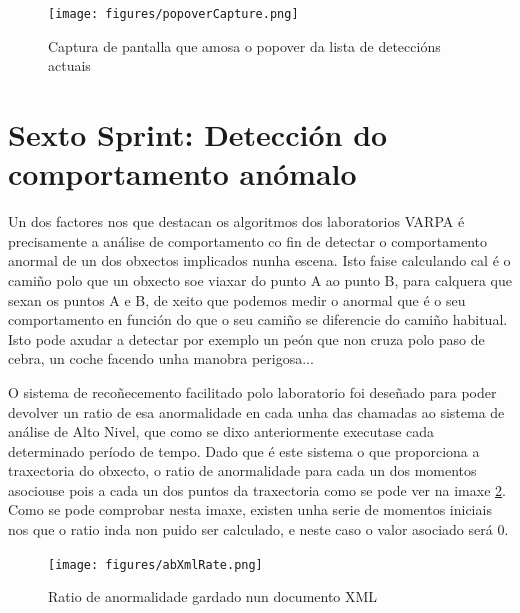         \begin{figure}[htp]
        \begin{center}
            \texttt{[image: figures/popoverCapture.png]}
            \caption{Captura de pantalla que amosa o popover da lista de deteccións actuais}
        \label{fig:popoverCapture}
        \end{center}
        \end{figure}
        
    
\section{Sexto Sprint: Detección do comportamento anómalo}
    
    Un dos factores nos que destacan os algoritmos dos laboratorios VARPA é precisamente a análise
    de comportamento co fin de detectar o comportamento anormal de un dos obxectos implicados nunha
    escena. Isto faise calculando cal é o camiño polo que un obxecto soe viaxar do punto A ao 
    punto B, para calquera que sexan os puntos A e B, de xeito que podemos medir o anormal que é
    o seu comportamento en función do que o seu camiño se diferencie do camiño habitual. Isto pode
    axudar a detectar por exemplo un peón que non cruza polo paso de cebra, un coche facendo unha 
    manobra perigosa...
    
    O sistema de recoñecemento facilitado polo laboratorio foi deseñado para poder devolver un ratio
    de esa anormalidade en cada unha das chamadas ao sistema de análise de Alto Nivel, que como se 
    dixo anteriormente executase cada determinado período de tempo. Dado que é este sistema o que
    proporciona a traxectoria do obxecto, o ratio de anormalidade para cada un dos momentos 
    asociouse pois a cada un dos puntos da traxectoria como se pode ver na imaxe \ref{fig:abXmlRate}.
    Como se pode comprobar nesta imaxe, existen unha serie de momentos iniciais nos que o ratio inda
    non puido ser calculado, e neste caso o valor asociado será 0.
    
    \begin{figure}[htp]
    \begin{center}
        \texttt{[image: figures/abXmlRate.png]}
        \caption{Ratio de anormalidade gardado nun documento XML}
    \label{fig:abXmlRate}
    \end{center}
    \end{figure}
    
